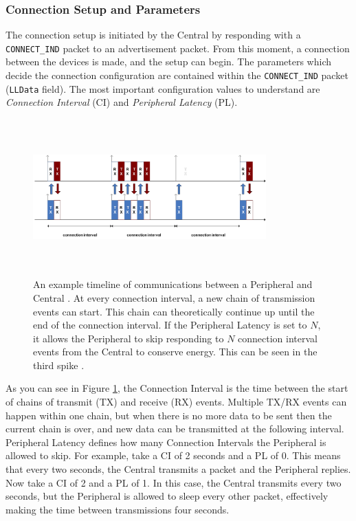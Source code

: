 \subsubsection{Connection Setup and Parameters}
The connection setup is initiated by the Central by responding with a \texttt{CONNECT\_IND} packet to an advertisement packet. From this moment, a connection between the devices is made, and the setup can begin. The parameters which decide the connection configuration are contained within the \texttt{CONNECT\_IND} packet (\texttt{LLData} field). The most important configuration values to understand are \textit{Connection Interval} (CI) and \textit{Peripheral Latency} (PL). 

\begin{figure}[]
    \centering
    \includegraphics[width=0.8\textwidth,height=6cm,keepaspectratio=true]{images/connection_interval_slave_latency}
    \caption{
        An example timeline of communications between a \color{red} Peripheral \color{black} and \color{blue} Central \color{black}. At every connection interval, a new chain of transmission events can start. This chain can theoretically continue up until the end of the connection interval. If the Peripheral Latency is set to $N$, it allows the Peripheral to skip responding to $N$ connection interval events from the Central to conserve energy. This can be seen in the third spike \cite{nordic_2022}.
    }
    \label{fig:ci_and_pl}
\end{figure}

As you can see in Figure \ref{fig:ci_and_pl}, the Connection Interval is the time between the start of chains of transmit (TX) and receive (RX) events. Multiple TX/RX events can happen within one chain, but when there is no more data to be sent then the current chain is over, and new data can be transmitted at the following interval. Peripheral Latency defines how many Connection Intervals the Peripheral is allowed to skip. For example, take a CI of 2 seconds and a PL of 0. This means that every two seconds, the Central transmits a packet and the Peripheral replies. Now take a CI of 2 and a PL of 1. In this case, the Central transmits every two seconds, but the Peripheral is allowed to sleep every other packet, effectively making the time between transmissions four seconds. 


